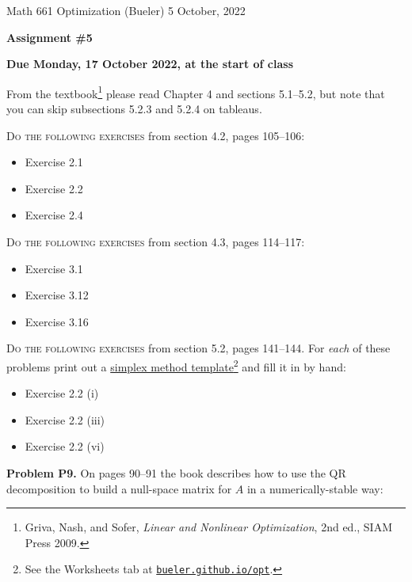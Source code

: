 \documentclass[12pt]{amsart}
\newcommand{\prob}[1]{\bigskip\noindent\textbf{#1}\quad }
\begin{document}
\scriptsize \noindent Math 661 Optimization (Bueler) \hfill 5 October, 2022
\normalsize

\medskip\bigskip

\Large\centerline{\textbf{Assignment \#5}}
\large
\bigskip

\centerline{\textbf{Due Monday, 17 October 2022, at the start of class}}
\bigskip
\normalsize

\thispagestyle{empty}

\bigskip
From the textbook\footnote{Griva, Nash, and Sofer, \emph{Linear and Nonlinear Optimization}, 2nd ed., SIAM Press 2009.} please read Chapter 4 and sections 5.1--5.2, but note that you can skip subsections 5.2.3 and 5.2.4 on tableaus.

\bigskip
\noindent \textsc{Do the following exercises} from section 4.2, pages 105--106:

\begin{itemize}
\item Exercise 2.1
\item Exercise 2.2
\item Exercise 2.4
\end{itemize}

\bigskip
\noindent \textsc{Do the following exercises} from section 4.3, pages 114--117:

\begin{itemize}
\item Exercise 3.1
\item Exercise 3.12
\item Exercise 3.16
\end{itemize}

\bigskip
\noindent \textsc{Do the following exercises} from section 5.2, pages 141--144.  For \emph{each} of these problems print out a \href{https://bueler.github.io/opt/assets/worksheets/F22/simplextemplate.pdf}{simplex method template}\footnote{See the Worksheets tab at \href{https://bueler.github.io/opt/}{\texttt{bueler.github.io/opt}}.} and fill it in by hand:

\begin{itemize}
\item Exercise 2.2 (i)
\item Exercise 2.2 (iii)
\item Exercise 2.2 (vi)
\end{itemize}


\prob{Problem P9.}  On pages 90--91 the book describes how to use the QR decomposition to build a null-space matrix for $A$ in a numerically-stable way:
\end{document}
